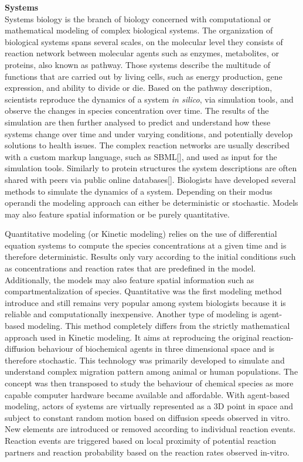 \textbf{Systems}\\
Systems biology is the branch of biology concerned with computational or mathematical modeling of complex biological systems.
The organization of biological systems spans several scales, on the molecular level they consists of reaction network between molecular agents such as enzymes, metabolites, or proteins, also known as pathway.
Those systems describe the multitude of functions that are carried out by living cells, such as energy production, gene expression, and ability to divide or die.
Based on the pathway description, scientists reproduce the dynamics of a system \textit{in silico}, via simulation tools, and observe the changes in species concentration over time.
The results of the simulation are then further analysed to predict and understand how these systems change over time and under varying conditions, and potentially develop solutions to health issues.
The complex reaction networks are usually described with a custom markup language, such as SBML[], and used as input for the simulation tools.
Similarly to protein structures the system descriptions are often shared with peers via public online databases[].
Biologists have developed several methods to simulate the dynamics of a system.
Depending on their modus operandi the modeling approach can either be deterministic or stochastic.
Models may also feature spatial information or be purely quantitative. 

Quantitative modeling (or Kinetic modeling) relies on the use of differential equation systems to compute the species concentrations at a given time and is therefore deterministic.
Results only vary according to the initial conditions such as concentrations and reaction rates that are predefined in the model.
Additionally, the models may also feature spatial information such as compartmentalization of species.
Quantitative was the first modeling method introduce and still remains very popular among system biologists because it is reliable and computationally inexpensive.
Another type of modeling is agent-based modeling.
This method completely differs from the strictly mathematical approach used in Kinetic modeling.
It aims at reproducing the original reaction-diffusion behaviour of biochemical agents in three dimensional space and is therefore stochastic.
This technology was primarily developed to simulate and understand complex migration pattern among animal or human populations.
The concept was then transposed to study the behaviour of chemical species as more capable computer hardware became available and affordable.
With agent-based modeling, actors of systems are virtually represented as a 3D point in space and subject to constant random motion based on diffusion speeds observed in vitro.
New elements are introduced or removed according to individual reaction events.
Reaction events are triggered based on local proximity of potential reaction partners and reaction probability based on the reaction rates observed in-vitro.

